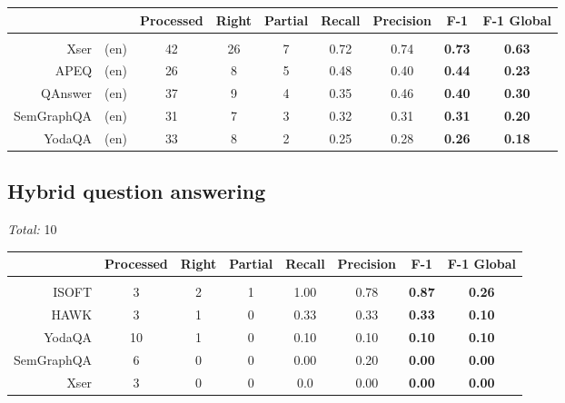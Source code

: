 \documentclass{article}
\begin{document}
\begin{tabular}{r@{\ }lccccccc}
& & Processed & Right & Partial & Recall & Precision & F-1 & F-1 Global \\
\hline \\[1ex]
Xser & (en) & 42 & 26 & 7 & 0.72 & 0.74 & \textbf{0.73} & \textbf{0.63} \\
APEQ & (en) & 26 & 8 & 5 & 0.48 & 0.40 & \textbf{0.44} & \textbf{0.23} \\
QAnswer & (en) & 37 & 9 & 4 & 0.35 & 0.46 & \textbf{0.40} & \textbf{0.30} \\
SemGraphQA & (en) & 31 & 7 & 3 & 0.32 & 0.31 & \textbf{0.31} & \textbf{0.20} \\
YodaQA & (en) & 33 & 8 & 2 & 0.25 & 0.28 & \textbf{0.26} & \textbf{0.18} \\
\end{tabular}

\subsection*{Hybrid question answering}

\emph{Total:} 10

\begin{tabular}{rccccccc}
& Processed & Right & Partial & Recall & Precision & F-1 & F-1 Global \\
\hline \\[1ex]
ISOFT & 3 & 2 & 1 & 1.00 & 0.78 & \textbf{0.87} & \textbf{0.26} \\
HAWK & 3 & 1 & 0 & 0.33 & 0.33 & \textbf{0.33} & \textbf{0.10} \\
YodaQA & 10 & 1 & 0 & 0.10 & 0.10 & \textbf{0.10} & \textbf{0.10} \\
SemGraphQA & 6 & 0 & 0 & 0.00 & 0.20 & \textbf{0.00} & \textbf{0.00} \\
Xser & 3 & 0 & 0 & 0.0 & 0.00 & \textbf{0.00} & \textbf{0.00} \\
\end{tabular}
\end{document}
